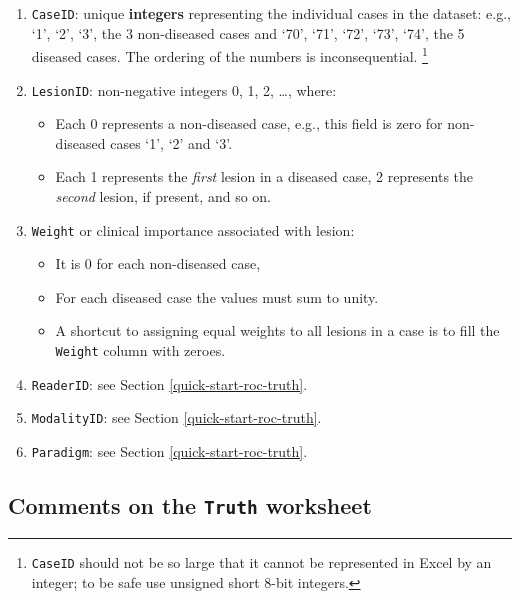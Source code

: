 \documentclass[
]{book}
\providecommand{\tightlist}{%
  \setlength{\itemsep}{0pt}\setlength{\parskip}{0pt}}
\begin{document}
\begin{enumerate}
\def\labelenumi{\arabic{enumi}.}
\item
  \texttt{CaseID}: unique \textbf{integers} representing the individual cases in the dataset: e.g., `1', `2', `3', the 3 non-diseased cases and `70', `71', `72', `73', `74', the 5 diseased cases. The ordering of the numbers is inconsequential. \footnote{\texttt{CaseID} should not be so large that it cannot be represented in Excel by an integer; to be safe use unsigned short 8-bit integers.}
\item
  \texttt{LesionID}: non-negative integers 0, 1, 2, \ldots, where:

  \begin{itemize}
  \tightlist
  \item
    Each 0 represents a non-diseased case, e.g., this field is zero for non-diseased cases `1', `2' and `3'.
  \item
    Each 1 represents the \emph{first} lesion in a diseased case, 2 represents the \emph{second} lesion, if present, and so on.
  \end{itemize}
\item
  \texttt{Weight} or clinical importance associated with lesion:

  \begin{itemize}
  \tightlist
  \item
    It is 0 for each non-diseased case,
  \item
    For each diseased case the values must sum to unity.
  \item
    A shortcut to assigning equal weights to all lesions in a case is to fill the \texttt{Weight} column with zeroes.
  \end{itemize}
\item
  \texttt{ReaderID}: see Section \ref{quick-start-roc-truth}.
\item
  \texttt{ModalityID}: see Section \ref{quick-start-roc-truth}.
\item
  \texttt{Paradigm}: see Section \ref{quick-start-roc-truth}.
\end{enumerate}

\hypertarget{quick-start-froc-truth-comments}{%
\subsection{\texorpdfstring{Comments on the \texttt{Truth} worksheet}{Comments on the Truth worksheet}}\label{quick-start-froc-truth-comments}}
\end{document}
